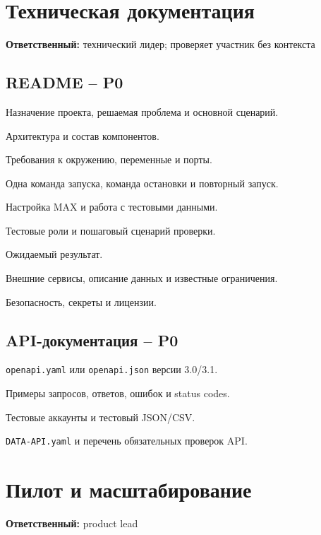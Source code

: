 \documentclass[11pt,a4paper]{article}
\newcommand{\PZero}{\textcolor{PZero}{\textbf{P0}}}
\newcommand{\owner}[1]{\textcolor{Muted}{\textbf{Ответственный:} #1}}
\newcommand{\code}[1]{\texttt{#1}}
\begin{document}
\section{Техническая документация}
\owner{технический лидер; проверяет участник без контекста}

\subsection{README -- \PZero}
\begin{tasklist}
  \item Назначение проекта, решаемая проблема и основной сценарий.
  \item Архитектура и состав компонентов.
  \item Требования к окружению, переменные и порты.
  \item Одна команда запуска, команда остановки и повторный запуск.
  \item Настройка MAX и работа с тестовыми данными.
  \item Тестовые роли и пошаговый сценарий проверки.
  \item Ожидаемый результат.
  \item Внешние сервисы, описание данных и известные ограничения.
  \item Безопасность, секреты и лицензии.
\end{tasklist}

\subsection{API-документация -- \PZero}
\begin{tasklist}
  \item \code{openapi.yaml} или \code{openapi.json} версии 3.0/3.1.
  \item Примеры запросов, ответов, ошибок и status codes.
  \item Тестовые аккаунты и тестовый JSON/CSV.
  \item \code{DATA-API.yaml} и перечень обязательных проверок API.
\end{tasklist}

\section{Пилот и масштабирование}
\owner{product lead}
\end{document}
